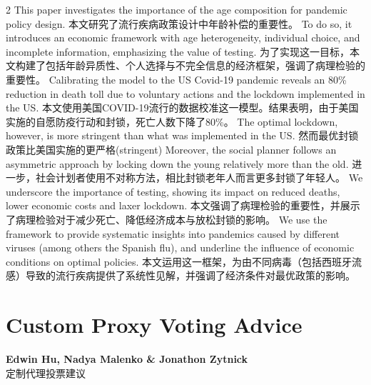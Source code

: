 \documentclass[cn,hazy,blue,14pt,screen]{elegantnote}
\begin{document}
\begin{paracol}{2}
	This paper investigates the importance of the age composition for pandemic policy design. 
	\switchcolumn
	本文研究了流行疾病政策设计中年龄补偿的重要性。
	\switchcolumn*
	To do so, it introduces an economic framework with age heterogeneity, individual choice, and incomplete information, emphasizing the value of testing. 
	\switchcolumn
	为了实现这一目标，本文构建了包括年龄异质性、个人选择与不完全信息的经济框架，强调了病理检验的重要性。
	\switchcolumn*
	Calibrating the model to the US Covid-19 pandemic reveals an 80\% reduction in death toll due to voluntary actions and the lockdown implemented in the US. 
	\switchcolumn
	本文使用美国COVID-19流行的数据校准这一模型。结果表明，由于美国实施的自愿防疫行动和封锁，死亡人数下降了80\%。
	\switchcolumn*
	The optimal lockdown, however, is more stringent than what was implemented in the US. 
	\switchcolumn
	然而最优封锁政策比美国实施的更严格(stringent)
	\switchcolumn*
	Moreover, the social planner follows an asymmetric approach by locking down the young relatively more than the old. 
	\switchcolumn
	进一步，社会计划者使用不对称方法，相比封锁老年人而言更多封锁了年轻人。
	\switchcolumn*
	We underscore the importance of testing, showing its impact on reduced deaths, lower economic costs and laxer lockdown. 
	\switchcolumn
	本文强调了病理检验的重要性，并展示了病理检验对于减少死亡、降低经济成本与放松封锁的影响。
	\switchcolumn*
	We use the framework to provide systematic insights into pandemics caused by different viruses (among others the Spanish flu), and underline the influence of economic conditions on optimal policies.
	\switchcolumn
	本文运用这一框架，为由不同病毒（包括西班牙流感）导致的流行疾病提供了系统性见解，并强调了经济条件对最优政策的影响。
	
\end{paracol}

\section{Custom Proxy Voting Advice}
\begin{center}
	\textbf{Edwin Hu, Nadya Malenko \& Jonathon Zytnick}\\
	定制代理投票建议
\end{center}
\end{document}
